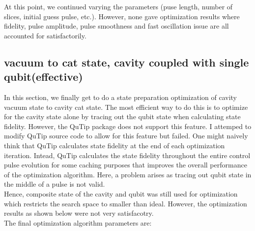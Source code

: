 \documentclass[12pt]{article}
\begin{document}
At this point, we continued varying the parameters (puse length, number of slices, initial guess pulse, etc.). 
However, none gave optimization results where fidelity, pulse amplitude, pulse smoothness and fast oscillation issue 
are all accounted for satisfactorily. 

\subsection{vacuum to cat state, cavity coupled with single qubit(effective)}
In this section, we finally get to do a state preparation optimization of cavity vacuum state to cavity cat state.
The most efficient way to do this is to optimize for the cavity state alone by tracing out the qubit state when calculating state fidelity. 
However, the QuTip package does not support this feature. I attemped to modify QuTip source code to allow for this feature but failed. 
One might naively think that QuTip calculates state fidelity at the end of each optimization iteration. 
Intead, QuTip calculates the state fidelity throughout the entire control pulse evolution for some caching purposes that improves the overall performance of the optimization algorithm. 
Here, a problem arises as tracing out qubit state in the middle of a pulse is not valid. 
\\
Hence, composite state of the cavity and qubit was still used for optimization which restricts the search space to smaller than ideal. 
However, the optimization results as shown below were not very satisfacotry. 
\\
The final optimization algorithm parameters are:
\\ 
\end{document}
